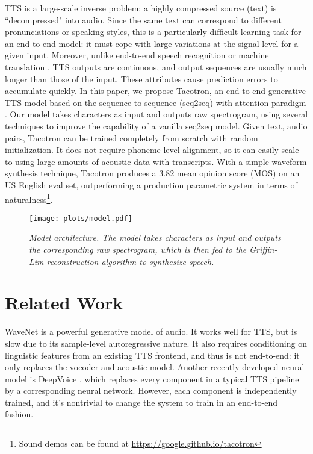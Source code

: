 \documentclass{article} \usepackage{iclr2017_conference,times}
\begin{document}
TTS is a large-scale inverse problem: a highly compressed source (text) is ``decompressed" into audio. Since the same text can correspond to different pronunciations or speaking styles, this is a particularly difficult learning task for an end-to-end model: it must cope with large variations at the signal level for a given input. Moreover, unlike end-to-end speech recognition \citep{chan2016listen} or machine translation \citep{wu2016google}, TTS outputs are continuous, and output sequences are usually much longer than those of the input. These attributes cause prediction errors to accumulate quickly. In this paper, we propose Tacotron, an end-to-end generative TTS model based on the sequence-to-sequence (seq2seq) \citep{sutskever2014sequence} with attention paradigm \citep{bahdanau2014neural}. Our model takes characters as input and outputs raw spectrogram, using several techniques to improve the capability of a vanilla seq2seq model. Given text, audio pairs, Tacotron can be trained completely from scratch with random initialization. It does not require phoneme-level alignment, so it can easily scale to using large amounts of acoustic data with transcripts. With a simple waveform synthesis technique, Tacotron produces a 3.82 mean opinion score (MOS) on an US English eval set, outperforming a production parametric system in terms of naturalness\footnote{Sound demos can be found at \url{https://google.github.io/tacotron}}.


\begin{figure*}[t]
\centering
\texttt{[image: plots/model.pdf]}
\caption{{\it Model architecture. The model takes characters as input and outputs the corresponding raw spectrogram, which is then fed to the Griffin-Lim reconstruction algorithm to synthesize speech.}}
\label{fig:model}
\end{figure*}


\section{Related Work}
WaveNet \citep{van2016wavenet} is a powerful generative model of audio. It works well for TTS, but is slow due to its sample-level autoregressive nature. It also requires conditioning on linguistic features from an existing TTS frontend, and thus is not end-to-end: it only replaces the vocoder and acoustic model. Another recently-developed neural model is DeepVoice \citep{arik2017deep}, which replaces every component in a typical TTS pipeline by a corresponding neural network. However, each component is independently trained, and it's nontrivial to change the system to train in an end-to-end fashion.
\end{document}
